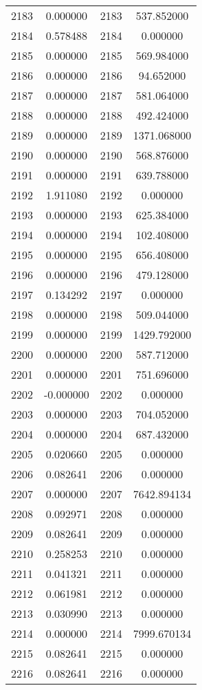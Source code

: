 \documentclass[12pt]{article}
\begin{document}
\begin{longtable}{@{}cccc@{}}
2183 & 0.000000 & 2183 & 537.852000 \\
2184 & 0.578488 & 2184 & 0.000000 \\
2185 & 0.000000 & 2185 & 569.984000 \\
2186 & 0.000000 & 2186 & 94.652000 \\
2187 & 0.000000 & 2187 & 581.064000 \\
2188 & 0.000000 & 2188 & 492.424000 \\
2189 & 0.000000 & 2189 & 1371.068000 \\
2190 & 0.000000 & 2190 & 568.876000 \\
2191 & 0.000000 & 2191 & 639.788000 \\
2192 & 1.911080 & 2192 & 0.000000 \\
2193 & 0.000000 & 2193 & 625.384000 \\
2194 & 0.000000 & 2194 & 102.408000 \\
2195 & 0.000000 & 2195 & 656.408000 \\
2196 & 0.000000 & 2196 & 479.128000 \\
2197 & 0.134292 & 2197 & 0.000000 \\
2198 & 0.000000 & 2198 & 509.044000 \\
2199 & 0.000000 & 2199 & 1429.792000 \\
2200 & 0.000000 & 2200 & 587.712000 \\
2201 & 0.000000 & 2201 & 751.696000 \\
2202 & -0.000000 & 2202 & 0.000000 \\
2203 & 0.000000 & 2203 & 704.052000 \\
2204 & 0.000000 & 2204 & 687.432000 \\
2205 & 0.020660 & 2205 & 0.000000 \\
2206 & 0.082641 & 2206 & 0.000000 \\
2207 & 0.000000 & 2207 & 7642.894134 \\
2208 & 0.092971 & 2208 & 0.000000 \\
2209 & 0.082641 & 2209 & 0.000000 \\
2210 & 0.258253 & 2210 & 0.000000 \\
2211 & 0.041321 & 2211 & 0.000000 \\
2212 & 0.061981 & 2212 & 0.000000 \\
2213 & 0.030990 & 2213 & 0.000000 \\
2214 & 0.000000 & 2214 & 7999.670134 \\
2215 & 0.082641 & 2215 & 0.000000 \\
2216 & 0.082641 & 2216 & 0.000000 \\

\end{longtable}
\end{document}
